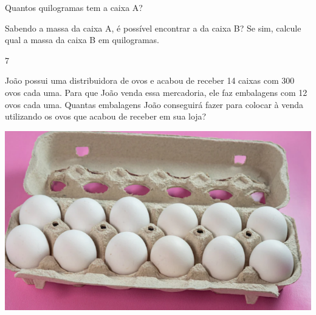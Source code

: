 \begin{escolha}
\item Quantos quilogramas tem a caixa A?

\bigskip
\bigskip
\bigskip

\item Sabendo a massa da caixa A, é possível encontrar a da caixa B? Se sim,
  calcule qual a massa da caixa B em quilogramas.

\end{escolha}

\num{7}

\begin{minipage}{.5\textwidth}
João possui uma distribuidora de ovos e acabou de receber 14 caixas
com 300 ovos cada uma. Para que João venda essa mercadoria, ele faz
embalagens com 12 ovos cada uma. Quantas embalagens João conseguirá
fazer para colocar à venda utilizando os ovos que acabou de receber em
sua loja?
\end{minipage}\hspace*{.5cm}
\begin{minipage}{.5\textwidth}
\includegraphics[width=\textwidth]{./imgs/mat3.png}
\end{minipage}


